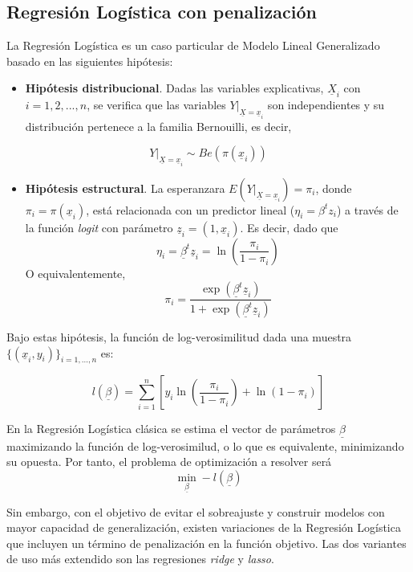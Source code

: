 \documentclass[12pt,a4paper,]{book}
\providecommand{\tightlist}{%
  \setlength{\itemsep}{0pt}\setlength{\parskip}{0pt}}
\numberwithin{dummy}{section}
\theoremstyle{ocrenumbox}
\theoremstyle{blacknumex}
\theoremstyle{blacknumbox}
\theoremstyle{ocrenum}
\theoremstyle{ocrenum}
\begin{document}
\hypertarget{regresiuxf3n-loguxedstica-con-penalizaciuxf3n}{%
\subsection{Regresión Logística con
penalización}\label{regresiuxf3n-loguxedstica-con-penalizaciuxf3n}}

La Regresión Logística es un caso particular de Modelo Lineal
Generalizado basado en las siguientes hipótesis:

\begin{itemize}
\tightlist
\item
  \textbf{Hipótesis distribucional}. Dadas las variables explicativas,
  \(\underline X_i\) con \(i = 1,2,...,n\), se verifica que las
  variables \(Y|_{\underline X= \underline x_i}\) son independientes y
  su distribución pertenece a la familia Bernouilli, es decir,
\end{itemize}

\[Y|_{\underline X= \underline x_i} \sim Be(\pi( \underline x_i))\]

\begin{itemize}
\tightlist
\item
  \textbf{Hipótesis estructural}. La esperanzara
  \(E(Y|_{\underline X = \underline x_i}) = \pi_i\), donde
  \(\pi_i = \pi( \underline x_i)\), está relacionada con un predictor
  lineal (\(\eta_i = \beta^t z_i\)) a través de la función \emph{logit}
  con parámetro \(\underline z_i = \left(1,\underline x_i\right)\). Es
  decir, dado que
  \[\eta_i = \underline \beta^t \underline z_i= \ln\left(\frac{\pi_i}{1-\pi_i}\right)\]
  O equivalentemente,
  \[\pi_i = \frac{\exp(\underline \beta^t \underline z_i)}{1 + \exp(\underline \beta^t \underline z_i)}\]
\end{itemize}

Bajo estas hipótesis, la función de log-verosimilitud dada una muestra
\(\{ (\underline x_i,y_i) \}_{i=1,...,n}\) es:

\[ l(\underline \beta) = 
\sum_{i=1}^n \left[ 
y_i\ln \left( \frac{\pi_i}{1-\pi_i} \right) + 
\ln \left( 1 - \pi_i\right) \right]\]

En la Regresión Logística clásica se estima el vector de parámetros
\(\underline \beta\) maximizando la función de log-verosimilud, o lo que
es equivalente, minimizando su opuesta. Por tanto, el problema de
optimización a resolver será
\[\min_{\underline \beta} -l(\underline \beta)\]

Sin embargo, con el objetivo de evitar el sobreajuste y construir
modelos con mayor capacidad de generalización, existen variaciones de la
Regresión Logística que incluyen un término de penalización en la
función objetivo. Las dos variantes de uso más extendido son las
regresiones \emph{ridge} y \emph{lasso}.
\end{document}
